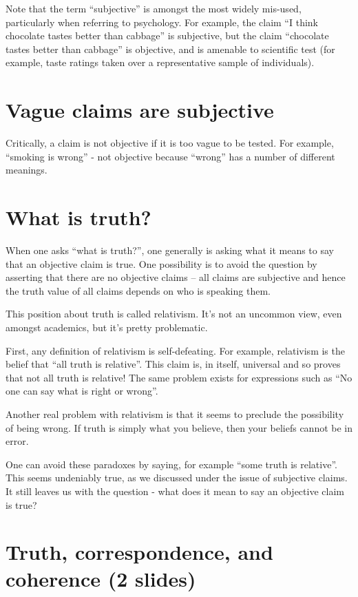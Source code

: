 \documentclass[12pt]{article}
\begin{document}
Note that the term ``subjective'' is amongst the most widely mis-used,
particularly when referring to psychology. For example, the claim ``I
think chocolate tastes better than cabbage'' is subjective, but the
claim ``chocolate tastes better than cabbage'' is objective, and is
amenable to scientific test (for example, taste ratings taken over a
representative sample of individuals).

\section{Vague claims are subjective}

Critically, a claim is not objective if it is too vague to be
tested. For example, ``smoking is wrong'' - not objective because
``wrong'' has a number of different meanings.

\section{What is truth?}

When one asks ``what is truth?'', one generally is asking what it
means to say that an objective claim is true. One possibility is to
avoid the question by asserting that there are no objective claims --
all claims are subjective and hence the truth value of all claims
depends on who is speaking them.

This position about truth is called relativism. It's not an uncommon
view, even amongst academics, but it's pretty problematic.

First, any definition of relativism is self-defeating. For example,
relativism is the belief that ``all truth is relative''. This claim
is, in itself, universal and so proves that not all truth is relative!
The same problem exists for expressions such as ``No one can say what
is right or wrong''.

Another real problem with relativism is that it seems to preclude the
possibility of being wrong. If truth is simply what you believe, then
your beliefs cannot be in error.

One can avoid these paradoxes by saying, for example ``some truth is
relative''. This seems undeniably true, as we discussed under the
issue of subjective claims. It still leaves us with the question -
what does it mean to say an objective claim is true?

\section{Truth, correspondence, and coherence (2 slides)}
\end{document}

